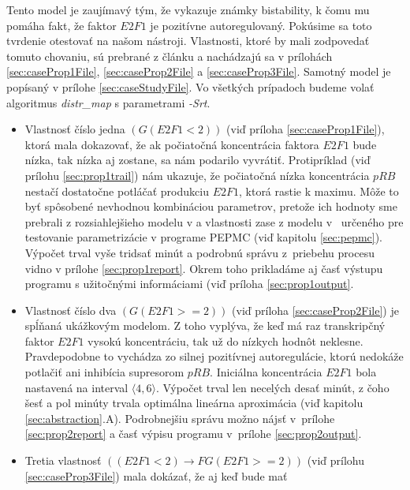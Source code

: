 \documentclass[11pt,final,oneside]{fithesis}
\begin{document}
Tento model je zauj\'imav\'y t\'ym, \v ze vykazuje zn\'amky bistability, k \v comu mu pom\'aha fakt, \v ze faktor $E2F1$ je pozit\'ivne autoregulovan\'y. 
Pok\'usime sa toto tvrdenie otestova\v t na na\v som n\'astroji. Vlastnosti, ktor\'e by mali zodpoveda\v t tomuto chovaniu, s\'u prebran\'e z \v cl\'anku
\cite{TCBB-2010} a nach\'adzaj\'u sa v pr\'iloh\'ach \ref{sec:caseProp1File}, \ref{sec:caseProp2File} a \ref{sec:caseProp3File}. Samotn\'y model je pop\'isan\'y 
v pr\'ilohe \ref{sec:caseStudyFile}. Vo v\v setk\'ych pr\'ipadoch budeme vola\v t algoritmus {\it distr\_map} s parametrami {\it -Srt}.
\begin{itemize}
\item Vlastnos\v t \v c\'islo jedna $(G(E2F1 < 2))$ (vi\v d pr\'iloha \ref{sec:caseProp1File}), ktor\'a mala dokazova\v t, \v ze ak po\v ciato\v cn\'a 
koncentr\'acia faktora $E2F1$ bude n\'izka, tak n\'izka aj zostane, sa n\'am podarilo vyvr\'ati\v t. Protipr\'iklad (vi\v d pr\'ilohu \ref{sec:prop1trail})
n\'am ukazuje, \v ze po\v ciato\v cn\'a n\'izka koncentr\'acia $pRB$ nesta\v c\'i dostato\v cne potl\'a\v ca\v t produkciu $E2F1$, ktor\'a rastie k maximu. 
M\^ o\v ze to by\v t sp\^ osoben\'e nevhodnou kombin\'aciou
parametrov, preto\v ze ich hodnoty sme prebrali z rozsiahlej\v sieho modelu v \cite{Swat:2004} a vlastnosti zase z modelu v~\cite{TCBB-2010} ur\v cen\'eho 
pre testovanie parametriz\'acie v programe PEPMC (vi\v d kapitolu \ref{sec:pepmc}). V\'ypo\v cet trval vy\v se tridsa\v t min\'ut a podrobn\'u spr\'avu 
z~priebehu procesu vidno v pr\'ilohe \ref{sec:prop1report}. Okrem toho priklad\'ame aj \v cas\v t v\'ystupu programu s u\v zito\v cn\'ymi inform\'aciami 
(vi\v d pr\'iloha \ref{sec:prop1output}.
\item Vlastnos\v t \v c\'islo dva $(G(E2F1 >= 2))$ (vi\v d pr\'iloha \ref{sec:caseProp2File}) je sp\'l\v nan\'a uk\'a\v zkov\'ym modelom. Z toho vypl\'yva, 
\v ze ke\v d m\'a raz transkrip\v cn\'y faktor $E2F1$ vysok\'u koncentr\'aciu, tak u\v z do n\'izkych hodn\^ ot neklesne. Pravdepodobne to vych\'adza 
zo silnej pozit\'ivnej autoregul\'acie, ktor\'u nedok\'a\v ze potla\v ci\v t ani inhib\'icia supresorom $pRB$. Inici\'alna koncentr\'acia $E2F1$ bola 
nastaven\'a na interval $\langle4,6\rangle$. V\'ypo\v cet trval len necel\'ych desa\v t min\'ut, z \v coho \v ses\v t a pol min\'uty trvala optim\'alna 
line\'arna aproxim\'acia (vi\v d kapitolu \ref{sec:abstraction}.A). Podrobnej\v siu spr\'avu mo\v zno n\'ajs\v t v~pr\'ilohe \ref{sec:prop2report} a 
\v cas\v t v\'ypisu programu v~pr\'ilohe \ref{sec:prop2output}.
\item Tretia vlastnos\v t $((E2F1 < 2) \rightarrow F G(E2F1 >= 2))$ (vi\v d pr\'ilohu \ref{sec:caseProp3File}) mala dok\'aza\v t, \v ze aj ke\v d bude ma\v t 

\end{itemize}
\end{document}
